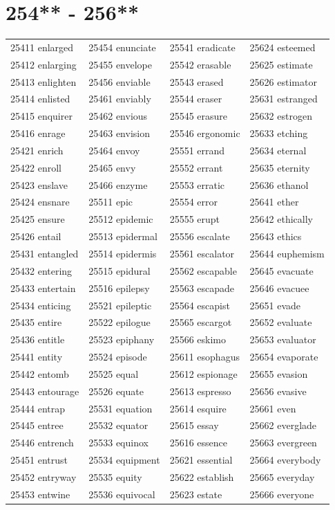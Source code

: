 \documentclass[10pt, oneside]{book}
\begin{document}
\begin{table}
	\centering
	\section*{254** - 256**}
	\begin{tabular}{l l l l}
25411 enlarged &25454 enunciate &25541 eradicate &25624 esteemed\\
25412 enlarging &25455 envelope &25542 erasable &25625 estimate\\
25413 enlighten &25456 enviable &25543 erased &25626 estimator\\
25414 enlisted &25461 enviably &25544 eraser &25631 estranged\\
25415 enquirer &25462 envious &25545 erasure &25632 estrogen\\
25416 enrage &25463 envision &25546 ergonomic &25633 etching\\
25421 enrich &25464 envoy &25551 errand &25634 eternal\\
25422 enroll &25465 envy &25552 errant &25635 eternity\\
25423 enslave &25466 enzyme &25553 erratic &25636 ethanol\\
25424 ensnare &25511 epic &25554 error &25641 ether\\
25425 ensure &25512 epidemic &25555 erupt &25642 ethically\\
25426 entail &25513 epidermal &25556 escalate &25643 ethics\\
25431 entangled &25514 epidermis &25561 escalator &25644 euphemism\\
25432 entering &25515 epidural &25562 escapable &25645 evacuate\\
25433 entertain &25516 epilepsy &25563 escapade &25646 evacuee\\
25434 enticing &25521 epileptic &25564 escapist &25651 evade\\
25435 entire &25522 epilogue &25565 escargot &25652 evaluate\\
25436 entitle &25523 epiphany &25566 eskimo &25653 evaluator\\
25441 entity &25524 episode &25611 esophagus &25654 evaporate\\
25442 entomb &25525 equal &25612 espionage &25655 evasion\\
25443 entourage &25526 equate &25613 espresso &25656 evasive\\
25444 entrap &25531 equation &25614 esquire &25661 even\\
25445 entree &25532 equator &25615 essay &25662 everglade\\
25446 entrench &25533 equinox &25616 essence &25663 evergreen\\
25451 entrust &25534 equipment &25621 essential &25664 everybody\\
25452 entryway &25535 equity &25622 establish &25665 everyday\\
25453 entwine &25536 equivocal &25623 estate &25666 everyone\\
	\end{tabular}
 \end{table}
\clearpage
\end{document}
